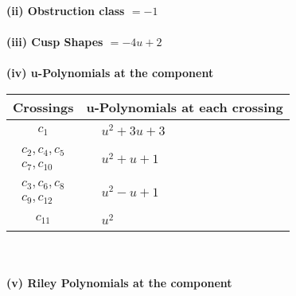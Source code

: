 \documentclass[1p]{elsarticle_modified}
\theoremstyle{definition}
\begin{document}
\flushleft \textbf{(ii) Obstruction class $= -1$}\\~\\
\flushleft \textbf{(iii) Cusp Shapes $= -4 u+2$}\\~\\
\newpage\renewcommand{\arraystretch}{1}
\flushleft \textbf{(iv) u-Polynomials at the component}\newline \\
\begin{tabular}{m{50pt}|m{274pt}}
Crossings & \hspace{64pt}u-Polynomials at each crossing \\
\hline $$\begin{aligned}c_{1}\end{aligned}$$&$\begin{aligned}
&u^2+3 u+3
\end{aligned}$\\
\hline $$\begin{aligned}c_{2},c_{4},c_{5}\\c_{7},c_{10}\end{aligned}$$&$\begin{aligned}
&u^2+u+1
\end{aligned}$\\
\hline $$\begin{aligned}c_{3},c_{6},c_{8}\\c_{9},c_{12}\end{aligned}$$&$\begin{aligned}
&u^2- u+1
\end{aligned}$\\
\hline $$\begin{aligned}c_{11}\end{aligned}$$&$\begin{aligned}
&u^2
\end{aligned}$\\
\hline
\end{tabular}\\~\\
\newpage\renewcommand{\arraystretch}{1}
\flushleft \textbf{(v) Riley Polynomials at the component}\newline \\
\end{document}
